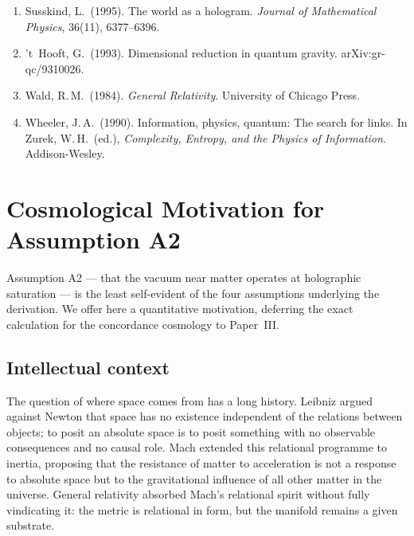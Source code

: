 \documentclass[12pt]{article}
\begin{document}
\begin{enumerate}
  \item\label{Susskind1995}
        Susskind, L.\ (1995).
        The world as a hologram.
        \textit{Journal of Mathematical Physics}, 36(11), 6377--6396.

  \item\label{tHooft1993}
        't~Hooft, G.\ (1993).
        Dimensional reduction in quantum gravity.
        arXiv:gr-qc/9310026.

  \item\label{Wald1984}
        Wald, R.\,M.\ (1984).
        \textit{General Relativity}.
        University of Chicago Press.

  \item\label{Wheeler1990}
        Wheeler, J.\,A.\ (1990).
        Information, physics, quantum: The search for links.
        In Zurek, W.\,H.\ (ed.),
        \textit{Complexity, Entropy, and the Physics of Information}.
        Addison-Wesley.

\end{enumerate}

\appendix
\section{Cosmological Motivation for Assumption A2}
\label{app:A2}

Assumption A2 --- that the vacuum near matter operates at holographic
saturation --- is the least self-evident of the four assumptions
underlying the derivation.
We offer here a quantitative motivation, deferring the exact
calculation for the concordance cosmology to Paper~III.

\subsection*{Intellectual context}

The question of where space comes from has a long history.
Leibniz argued against Newton that space has no existence independent
of the relations between objects; to posit an absolute space is to
posit something with no observable consequences and no causal role.
Mach \cite{Mach1883} extended this relational programme to inertia,
proposing that the resistance of matter to acceleration is not a
response to absolute space but to the gravitational influence of all
other matter in the universe.
General relativity absorbed Mach's relational spirit without fully
vindicating it: the metric is relational in form, but the manifold
remains a given substrate.
\end{document}
